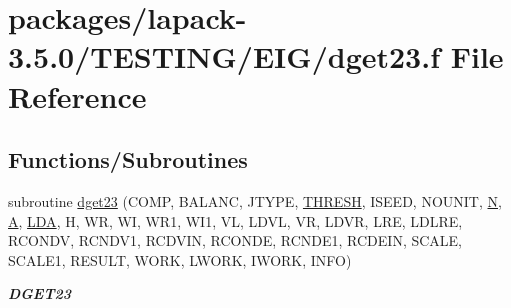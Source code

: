 \hypertarget{dget23_8f}{}\section{packages/lapack-\/3.5.0/\+T\+E\+S\+T\+I\+N\+G/\+E\+I\+G/dget23.f File Reference}
\label{dget23_8f}
\subsection*{Functions/\+Subroutines}
\begin{DoxyCompactItemize}
\item 
subroutine \hyperlink{group__double__eig_gaa52ccc18dfdd08a5c0af32a0bb689f6c}{dget23} (C\+O\+M\+P, B\+A\+L\+A\+N\+C, J\+T\+Y\+P\+E, \hyperlink{zlaqgs_8c_a0656018abfc9fa2821827415f5d5ea57}{T\+H\+R\+E\+S\+H}, I\+S\+E\+E\+D, N\+O\+U\+N\+I\+T, \hyperlink{polmisc_8c_a0240ac851181b84ac374872dc5434ee4}{N}, \hyperlink{classA}{A}, \hyperlink{example__user_8c_ae946da542ce0db94dced19b2ecefd1aa}{L\+D\+A}, H, W\+R, W\+I, W\+R1, W\+I1, V\+L, L\+D\+V\+L, V\+R, L\+D\+V\+R, L\+R\+E, L\+D\+L\+R\+E, R\+C\+O\+N\+D\+V, R\+C\+N\+D\+V1, R\+C\+D\+V\+I\+N, R\+C\+O\+N\+D\+E, R\+C\+N\+D\+E1, R\+C\+D\+E\+I\+N, S\+C\+A\+L\+E, S\+C\+A\+L\+E1, R\+E\+S\+U\+L\+T, W\+O\+R\+K, L\+W\+O\+R\+K, I\+W\+O\+R\+K, I\+N\+F\+O)
\begin{DoxyCompactList}\small\item\em {\bfseries D\+G\+E\+T23} \end{DoxyCompactList}\end{DoxyCompactItemize}
